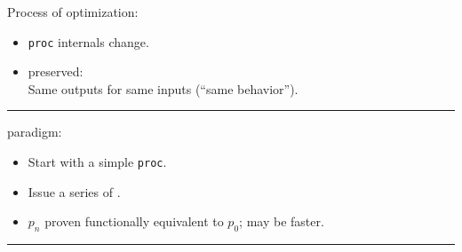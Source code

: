 \newpage
{}

{\large

}

\newpage
{}

{\large

}

\newpage
{}

\begin{center}
{\large
\begin{tikzpicture}[node distance=8mm]

\end{tikzpicture}
}
\end{center}

{\LARGE
Process of optimization:
\begin{itemize}
  \item \texttt{proc} internals change.
  \item {} preserved:\\ Same outputs for same inputs (``same behavior'').
\end{itemize}

}
\vfill
\hrule
{\large

}


\newpage
{}

\begin{center}
{\large
\begin{tikzpicture}[node distance=8mm]

\end{tikzpicture}
}
\end{center}

{\LARGE
{} paradigm:
\begin{itemize}
  \item Start with a simple \texttt{proc}.
  \item Issue a series of .
  \item $p_n$ proven functionally equivalent to $p_0$; may be faster.
\end{itemize}

}
\vfill
\hrule
{\large

}


\newpage
{}

\begin{center}
{\large
\begin{tikzpicture}[node distance=8mm]

\end{tikzpicture}
}
\end{center}

